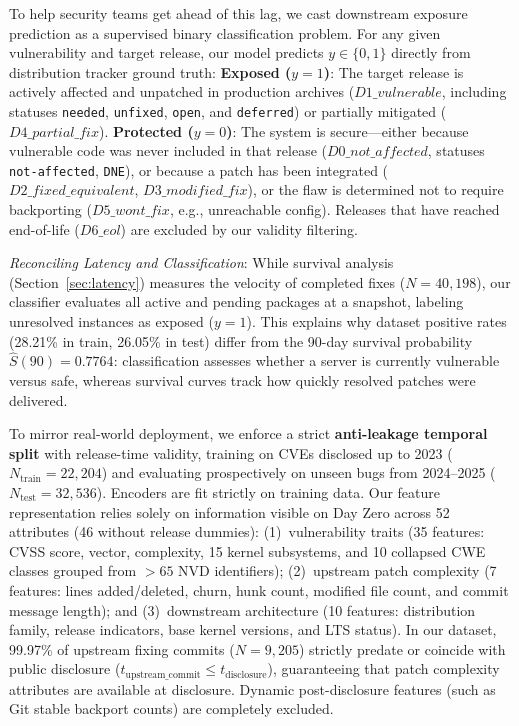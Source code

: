 \documentclass[graybox]{svmult}
\begin{document}
To help security teams get ahead of this lag, we cast downstream exposure prediction as a supervised binary classification problem. For any given vulnerability and target release, our model predicts $y \in \{0, 1\}$ directly from distribution tracker ground truth:
\textbf{Exposed ($y = 1$)}: The target release is actively affected and unpatched in production archives ($D1\_vulnerable$, including statuses \texttt{needed}, \texttt{unfixed}, \texttt{open}, and \texttt{deferred}) or partially mitigated ($D4\_partial\_fix$).
\textbf{Protected ($y = 0$)}: The system is secure---either because vulnerable code was never included in that release ($D0\_not\_affected$, statuses \texttt{not-affected}, \texttt{DNE}), or because a patch has been integrated ($D2\_fixed\_equivalent$, $D3\_modified\_fix$), or the flaw is determined not to require backporting ($D5\_wont\_fix$, e.g., unreachable config). Releases that have reached end-of-life ($D6\_eol$) are excluded by our validity filtering.

\textit{Reconciling Latency and Classification}: While survival analysis (Section~\ref{sec:latency}) measures the velocity of completed fixes ($N = 40,198$), our classifier evaluates all active and pending packages at a snapshot, labeling unresolved instances as exposed ($y = 1$). This explains why dataset positive rates (28.21\% in train, 26.05\% in test) differ from the 90-day survival probability $\hat{S}(90) = 0.7764$: classification assesses whether a server is currently vulnerable versus safe, whereas survival curves track how quickly resolved patches were delivered.

To mirror real-world deployment, we enforce a strict \textbf{anti-leakage temporal split} with release-time validity, training on CVEs disclosed up to 2023 ($N_{\text{train}} = 22,204$) and evaluating prospectively on unseen bugs from 2024--2025 ($N_{\text{test}} = 32,536$). Encoders are fit strictly on training data. Our feature representation relies solely on information visible on Day Zero across 52 attributes (46 without release dummies): (1)~vulnerability traits (35 features: CVSS score, vector, complexity, 15 kernel subsystems, and 10 collapsed CWE classes grouped from $>65$ NVD identifiers); (2)~upstream patch complexity (7 features: lines added/deleted, churn, hunk count, modified file count, and commit message length); and (3)~downstream architecture (10 features: distribution family, release indicators, base kernel versions, and LTS status). In our dataset, 99.97\% of upstream fixing commits ($N = 9,205$) strictly predate or coincide with public disclosure ($t_{\text{upstream\_commit}} \le t_{\text{disclosure}}$), guaranteeing that patch complexity attributes are available at disclosure. Dynamic post-disclosure features (such as Git stable backport counts) are completely excluded.
\end{document}
